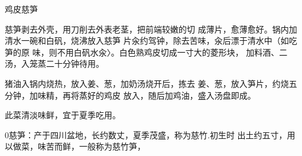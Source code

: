 \begin{recipe}{鸡皮慈笋}

\ingredients



\cooking

慈笋剥去外壳，用刀削去外表老茎，把前端较嫩的切 成薄片，愈薄愈好。锅内加清水一碗和白矾，烧沸放入慈笋 片汆约驾钟，除去苦味，汆后漂于清水中（如吃笋的原 味，则不用白矾水汆〉。白色熟鸡皮切成一寸大的菱形块， 加料酒、二汤，入笼蒸二十分钟待用。

\step 猪油入锅内烧热，放入姜、葱，加奶汤烧开后，拣去 姜、葱，放入笋片，约烧五分钟，加味精，再将蒸好的鸡皮 放入，随后加鸡油，盛入汤盘即成。

\notes

此菜清淡味鲜，宜于夏季吃用。

0慈笋：产于四川盆地，长约数丈，夏季茂盛，称为慈竹.初生时 出土约五寸，用以做菜，味苦而鲜，一般称为慈竹笋，

\end{recipe}

